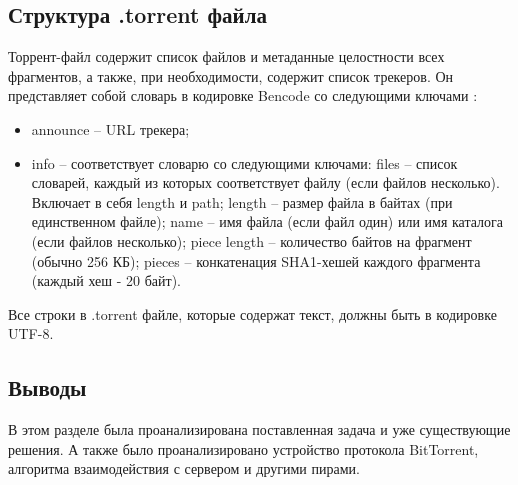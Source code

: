 \subsection{Структура .torrent файла}

Торрент-файл содержит список файлов и метаданные целостности всех фрагментов, а также, при необходимости, содержит список трекеров. Он представляет собой словарь в кодировке Bencode со следующими ключами \cite{torrent_struct}:

\begin{itemize}
	\item announce -- URL трекера;
	\item info -- соответствует словарю со следующими ключами:
	\subitem files -- список словарей, каждый из которых соответствует файлу (если файлов несколько). Включает в себя length и path;
	\subitem length -- размер файла в байтах (при единственном файле);
	\subitem name -- имя файла (если файл один) или имя каталога (если файлов несколько);
	\subitem piece length -- количество байтов на фрагмент (обычно 256 КБ);
	\subitem pieces -- конкатенация SHA1-хешей каждого фрагмента (каждый хеш - 20 байт).
\end{itemize}

Все строки в .torrent файле, которые содержат текст, должны быть в кодировке UTF-8.

\subsection*{Выводы}

В этом разделе была проанализирована поставленная задача и уже существующие решения. А также было проанализировано устройство протокола BitTorrent, алгоритма взаимодействия с сервером и другими пирами.


